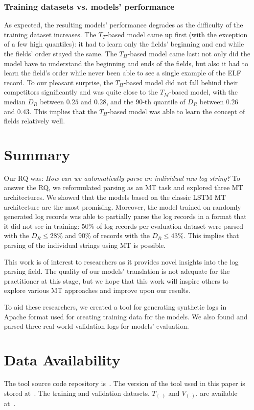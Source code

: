 \documentclass{article}
\begin{document}
\subsubsection{Training datasets vs. models' performance} As expected, the resulting models' performance degrades as the difficulty of the training dataset increases. The $T_T$-based model came up first (with the exception of a few high quantiles): it had to learn only the fields' beginning and end while the fields' order stayed the same. The $T_H$-based model came last: not only did the model have to understand the beginning and ends of the fields, but also it had to learn the field's order while never been able to see a single example of the ELF record. To our pleasant surprise, the $T_H$-based model did not fall behind their competitors significantly and was quite close to the $ T_M $-based model, with the median $ D_R$ between $0.25$ and  $0.28$, and the 90-th quantile of $D_R$ between $0.26$ and  $0.43$. This implies that the $ T_H $-based model was able to learn the concept of fields relatively well.



\section{Summary} \label{sec:summary}
Our RQ was: \textit{How can we automatically parse an individual raw log string?} To answer the RQ, we reformulated parsing as an MT task and explored three MT architectures. We showed that the models based on the classic LSTM MT architecture are the most promising. 
Moreover, the model trained on randomly generated log records was able to partially parse the log records in a format that it did not see in training: 50\% of log records per evaluation dataset were parsed with the $D_R \leq 28\%$ and 90\% of records with the $D_R \leq 43\%$.  This implies that parsing of the individual strings using MT is possible.

This work is of interest to researchers as it provides novel insights into the log parsing field. The quality of our models’ translation is not adequate for the practitioner at this stage, but we hope that this work will inspire others to explore various MT approaches and improve upon our results. 

To aid these researchers, we created a tool for generating synthetic logs in Apache format used for creating training data for the models. We also found and parsed three real-world validation logs for models’ evaluation. 

\section{Data Availability}\label{sec:access}
The tool source code repository is~\cite{dat:github}. The version of the tool used in this paper is stored at~\cite{code:zenodo}. The training and validation datasets, $T_{(\cdot)}$ and $V_{(\cdot)}$, are available at~\cite{dat:zenodo}.

 
\end{document}
